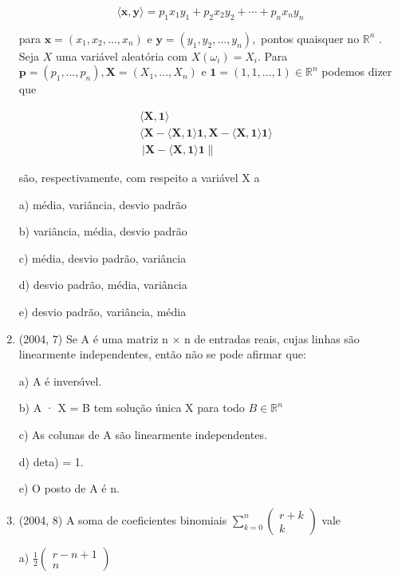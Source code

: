 \documentclass{article}
\begin{document}
\begin{enumerate}
$$\langle\mathbf{x}, \mathbf{y}\rangle= p_{1} x_{1} y_{1}+p_{2} x_{2} y_{2}+\cdots+p_{n} x_{n} y_{n}$$

para $\mathbf{x}=\left(x_{1}, x_{2}, \ldots, x_{n}\right)$ e $\mathbf{y}=\left(y_{1}, y_{2}, \ldots, y_{n}\right),$ pontos quaisquer no $\mathbb{R}^{n}$ .
Seja $X$ uma variável aleatória com $X\left(\omega_{i}\right)=X_{i} .$ Para $\mathbf{p}=\left(p_{1}, \ldots, p_{n}\right), \mathbf{X}=\left(X_{1}, \ldots, X_{n}\right)$
e $\mathbf{1}=(1,1, \ldots, 1) \in \mathbb{R}^{n}$ podemos dizer que

$$\begin{aligned}\langle\mathbf{X}, \mathbf{1}\rangle &
\\\langle\mathbf{X}-\langle\mathbf{X}, \mathbf{1}\rangle \mathbf{1}, \mathbf{X}-\langle\mathbf{X}, \mathbf{1}\rangle \mathbf{1}\rangle \\\
|\mathbf{X}-\langle\mathbf{X}, \mathbf{1}\rangle \mathbf{1}\| \end{aligned}$$


são, respectivamente, com respeito a variável X a

a) média, variância, desvio padrão

b) variância, média, desvio padrão

c) média, desvio padrão, variância

d) desvio padrão, média, variância

e) desvio padrão, variância, média \newline




\item(2004, 7) Se A é uma matriz n × n de entradas reais, cujas linhas são linearmente independentes, então não se pode afirmar que: 

a) A é inversı́vel.

b) A · X = B tem solução única X para todo $B \in \mathbb{R}^{n}$

c) As colunas de A são linearmente independentes.

d) deta) = 1.

e) O posto de A é n. \newline  


\item(2004, 8) A soma de coeficientes binomiais $\sum_{k=0}^{n}\left(\begin{array}{c}{r+k} \\ {k}\end{array}\right)$ vale

a) $\frac{1}{2}\left(\begin{array}{c}{r-n+1} \\ {n}\end{array}\right)$


\end{enumerate}
\end{document}
